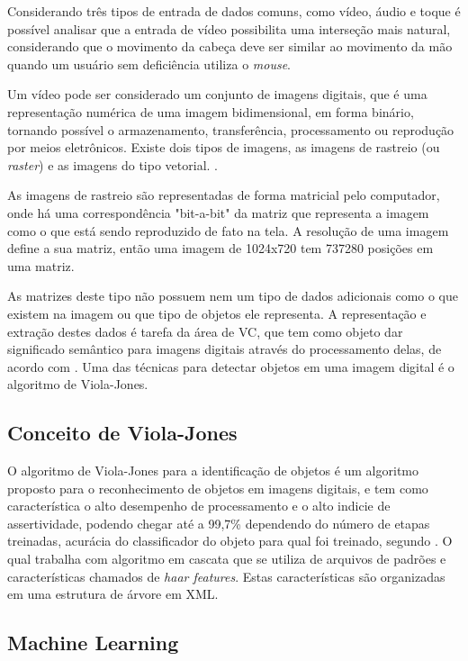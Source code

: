 Considerando três tipos de entrada de dados comuns, como vídeo, áudio e toque é possível analisar que a entrada de vídeo possibilita uma interseção mais natural, considerando que o movimento da cabeça deve ser similar ao movimento da mão quando um usuário sem deficiência utiliza o \textit{mouse}.

Um vídeo pode ser considerado um conjunto de imagens digitais, que é uma representação numérica de uma imagem bidimensional, em forma binário, tornando possível o armazenamento, transferência, processamento ou reprodução por meios eletrônicos. Existe dois tipos de imagens, as imagens de rastreio (ou \textit{raster}) e as imagens do tipo vetorial. \cite{parker2010algorithms-UPPERCASE}.

As imagens de rastreio são representadas de forma matricial pelo computador, onde há uma correspondência "bit-a-bit" da matriz que representa a imagem como o que está sendo reproduzido de fato na tela. A resolução de uma imagem define a sua matriz, então uma imagem de 1024x720 tem 737280 posições em uma matriz. 

As matrizes deste tipo não possuem nem um tipo de dados adicionais como o que existem na imagem ou que tipo de objetos ele representa. A representação e extração destes dados é tarefa da área de VC, que tem como objeto dar significado semântico para imagens digitais através do processamento delas, de acordo com . Uma das técnicas para detectar objetos em uma imagem digital é o algoritmo de Viola-Jones.

\subsection{Conceito de Viola-Jones}

O algoritmo de Viola-Jones para a identificação de objetos é um algoritmo proposto para o reconhecimento de objetos em imagens digitais, e tem como característica o alto desempenho de processamento e o alto indicie de assertividade, podendo chegar até a 99,7\% dependendo do número de etapas treinadas, acurácia do classificador do objeto para qual foi treinado, segundo . O qual trabalha com algoritmo em cascata que se utiliza de arquivos de padrões e características chamados de \textit{haar features}. Estas características são organizadas em uma estrutura de árvore em XML.

\subsection{Machine Learning}

